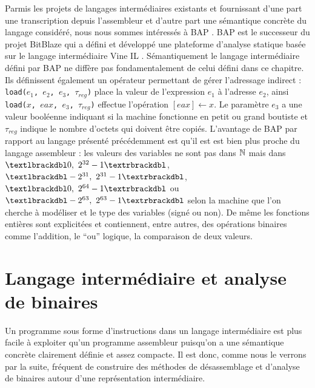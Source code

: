 Parmis les projets de langages intermédiaires existants et fournissant d'une part une transcription depuis l'assembleur et d'autre part une sémantique concrète du langage considéré, nous nous sommes intéressés à BAP \cite{BAP11}. 
BAP est le successeur du projet BitBlaze qui a défini et développé une plateforme d'analyse statique basée sur le langage intermédiaire Vine IL \cite{bitblaze08}. 
Sémantiquement le langage intermédiaire défini par BAP ne diffère pas fondamentalement de celui défini dans ce chapitre. 
Ils définissent également un opérateur permettant de gérer l'adressage indirect : \texttt{load($e_1$, $e_2$, $e_3$, $\tau_{reg}$)} place la valeur de l'expression $e_1$ à l'adresse $e_2$, ainsi \texttt{load($x$, $eax$, $e_3$, $\tau_{reg}$)} effectue l'opération \texttt{$[eax]\leftarrow x$}. 
Le paramètre $e_3$ a une valeur booléenne indiquant si la machine fonctionne en petit ou grand boutiste et $\tau_{reg}$ indique le nombre d'octets qui doivent être copiés. 
L'avantage de BAP par rapport au langage présenté précédemment est qu'il est est bien plus proche du langage assembleur : les valeurs des variables ne sont pas dans $\mathbb N$ mais dans $\textlbrackdbl 0,\ 2^{32}-1\textrbrackdbl$, $\textlbrackdbl -2^{31},\ 2^{31}-1\textrbrackdbl$, $\textlbrackdbl 0,\ 2^{64}-1\textrbrackdbl$ ou $\textlbrackdbl -2^{63},\ 2^{63}-1\textrbrackdbl$ selon la machine que l'on cherche à modéliser et le type des variables (signé ou non). 
De même les fonctions entières sont explicitées et contiennent, entre autres, des opérations binaires comme l'addition, le ``ou'' logique, la comparaison de deux valeurs.


\section{Langage intermédiaire et analyse de binaires}
Un programme sous forme d'instructions dans un langage intermédiaire est plus facile à exploiter qu'un programme assembleur puisqu'on a une sémantique concrète clairement définie et assez compacte.
Il est donc, comme nous le verrons par la suite, fréquent de construire des méthodes de désassemblage et d'analyse de binaires autour d'une représentation intermédiaire.

